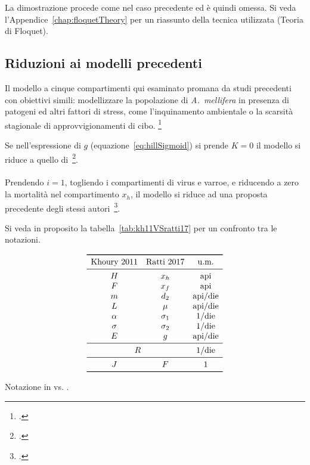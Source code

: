 La dimostrazione procede come nel caso precedente ed è quindi omessa.
Si veda l'Appendice~\ref{chap:floquetTheory}
per un riassunto della tecnica utilizzata (Teoria di Floquet).


\subsection{Riduzioni ai modelli precedenti}
Il modello a cinque compartimenti qui esaminato promana da studi precedenti con obiettivi simili:
modellizzare la popolazione di \emph{A.~mellifera} in presenza di patogeni ed altri fattori di stress, come
l'inquinamento ambientale o la scarsità stagionale di approvvigionamenti di cibo.
\footcite{ratti2012,ratti2015,sumMar04,khoury2011,betti2016,betti2014}

Se nell'espressione di $g$ (equazione~\eqref{eq:hillSigmoid}) si prende $K=0$ il modello si riduce a
quello di~\citeauthor{sumMar04}\footcite{sumMar04}.

\paragraph{}
Prendendo $i=1$, togliendo i compartimenti di virus e varroe, e riducendo a zero la mortalità nel
compartimento $x_h$, il modello si riduce ad una proposta precedente degli stessi autori~\footcite{khoury2011}.

Si veda in proposito la tabella~\ref{tab:kh11VSratti17} per un confronto tra le notazioni.

\begin{table}[pbh]
    $$\begin{array}{ccc}
        \toprule
        \text{Khoury~2011}
        & \text{Ratti~2017}
        & \text{u.m.} \\
        \midrule
        H & x_h & \text{api} \\
        F & x_f & \text{api} \\
        m & d_2 & \text{api}/\text{die} \\
        L & \mu & \text{api}/\text{die} \\
        \alpha & \sigma_1 & 1/\text{die} \\
        \sigma & \sigma_2 & 1/\text{die} \\
        E & g & \text{api}/\text{die} \\
        \midrule
        \multicolumn{2}{c}{R} & 1/\text{die} \\
        \midrule
        J & F & 1 \\
        \bottomrule
    \end{array}$$
    \caption{Notazione in \cite{khoury2011} vs. \cite{ratti2017}.}
    \label{tab:kh11VSratti17}
\end{table}

